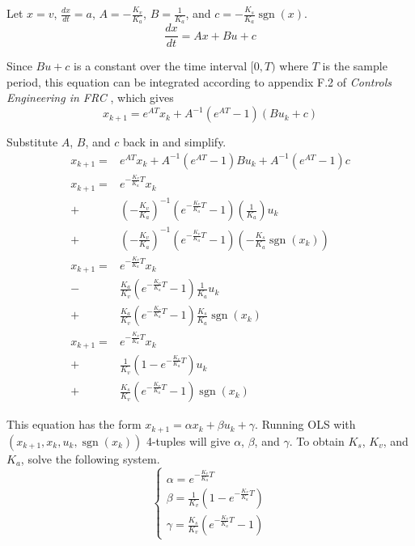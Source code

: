 \documentclass[10pt,conference,compsoc]{IEEEtran}
\DeclareMathOperator{\sgn}{sgn}
\begin{document}
Let $x = v$, $\frac{dx}{dt} = a$, $A = -\frac{K_v}{K_a}$, $B = \frac{1}{K_a}$,
and $c = -\frac{K_s}{K_a}\sgn(x)$.
\begin{equation*}
  \frac{dx}{dt} = Ax + Bu + c
\end{equation*}

Since $Bu + c$ is a constant over the time interval $[0, T)$ where $T$ is the
sample period, this equation can be integrated according to appendix F.2 of
\textit{Controls Engineering in FRC} \cite{bib:controls-in-frc}, which gives
\begin{equation*}
  x_{k+1} = e^{AT} x_k + A^{-1} (e^{AT} - 1) (Bu_k + c)
\end{equation*}

Substitute $A$, $B$, and $c$ back in and simplify.
\begin{equation*}
  \begin{aligned}
    x_{k+1} =& e^{AT} x_k + A^{-1} (e^{AT} - 1)Bu_k + A^{-1} (e^{AT} - 1)c \\
    x_{k+1} =& e^{-\frac{K_v}{K_a} T} x_k \\
      +& \left(-\frac{K_v}{K_a}\right)^{-1}
        \left(e^{-\frac{K_v}{K_a} T} - 1\right)
        \left(\frac{1}{K_a}\right) u_k \\
      +& \left(-\frac{K_v}{K_a}\right)^{-1}
        \left(e^{-\frac{K_v}{K_a} T} - 1\right)
        \left(-\frac{K_s}{K_a}\sgn(x_k)\right) \\
    x_{k+1} =& e^{-\frac{K_v}{K_a} T} x_k \\
      -& \frac{K_a}{K_v}
        \left(e^{-\frac{K_v}{K_a} T} - 1\right)
        \frac{1}{K_a} u_k \\
      +& \frac{K_a}{K_v}
        \left(e^{-\frac{K_v}{K_a} T} - 1\right)
        \frac{K_s}{K_a}\sgn(x_k) \\
    x_{k+1} =& e^{-\frac{K_v}{K_a} T} x_k \\
      +& \frac{1}{K_v}
        \left(1 - e^{-\frac{K_v}{K_a} T}\right) u_k \\
      +& \frac{K_s}{K_v}
        \left(e^{-\frac{K_v}{K_a} T} - 1\right)\sgn(x_k)
  \end{aligned}
\end{equation*}

This equation has the form $x_{k+1} = \alpha x_k + \beta u_k + \gamma$. Running
OLS with $(x_{k+1}, x_k, u_k, \sgn(x_k))$ 4-tuples will give $\alpha$, $\beta$,
and $\gamma$. To obtain $K_s$, $K_v$, and $K_a$, solve the following system.
\begin{equation*}
  \begin{cases}
    \alpha = e^{-\frac{K_v}{K_a} T} \\
    \beta = \frac{1}{K_v}\left(1 - e^{-\frac{K_v}{K_a} T}\right) \\
    \gamma = \frac{K_s}{K_v}\left(e^{-\frac{K_v}{K_a} T} - 1\right)
  \end{cases}
\end{equation*}
\end{document}
